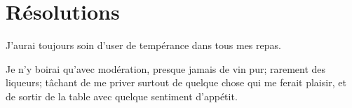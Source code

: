 \documentclass[instructions.tex]{subfiles}
\begin{document}
\section{Résolutions}
 
\primo J'aurai toujours soin d'user de tempérance dans tous mes repas. 

\secundo Je n'y boirai qu'avec modération, presque jamais de vin pur; rarement des liqueurs; tâchant de me priver surtout de quelque chose qui me ferait plaisir, et de sortir de la table avec quelque sentiment d'appétit. 

 
\end{document}

